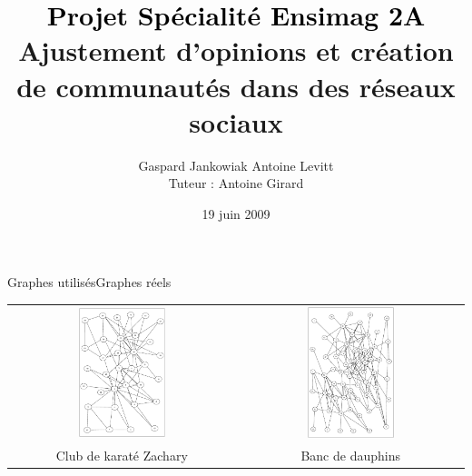 \documentclass{beamer}
\author{Gaspard Jankowiak \quad Antoine Levitt\\ Tuteur : Antoine Girard}
\title{{\textbf{\textcolor{black}{Projet Spécialité Ensimag 2A}}}\vspace{1cm}\\ {Ajustement d'opinions et création de communautés dans des réseaux
sociaux}}
\date{19 juin 2009}
\begin{document}
\begin{frame}
	\maketitle
\end{frame}

\begin{frame}{Graphes utilisés}{Graphes réels}
	\begin{center}
		\begin{tabular}[h]{cc}
			\includegraphics[width=0.4\textwidth]{pres-za}&
			\includegraphics[width=0.4\textwidth]{pres-do}
			\\
			Club de karaté Zachary & Banc de dauphins
		\end{tabular}
	\end{center}
\end{frame}
\end{document}
